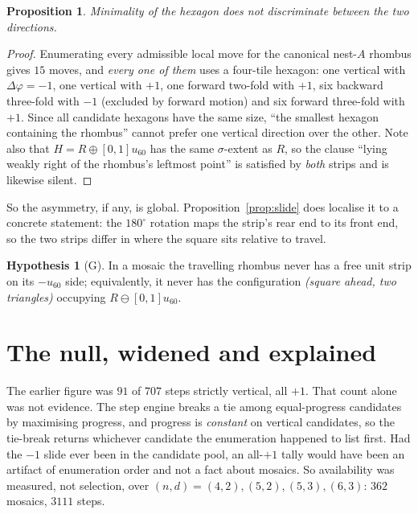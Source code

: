 \documentclass[11pt]{article}
\theoremstyle{plain}
\newtheorem{proposition}[theorem]{Proposition}
\theoremstyle{definition}
\newtheorem{hypothesis}[theorem]{Hypothesis}
\begin{document}
\begin{proposition}\label{prop:minimality}
Minimality of the hexagon does not discriminate between the two directions.
\end{proposition}

\begin{proof}
Enumerating every admissible local move for the canonical nest-$A$ rhombus gives
$15$ moves, and \emph{every one of them} uses a four-tile hexagon:
one vertical with $\Delta\varphi=-1$, one vertical with $+1$, one forward
two-fold with $+1$, six backward three-fold with $-1$ (excluded by forward
motion) and six forward three-fold with $+1$.  Since all candidate hexagons have
the same size, ``the smallest hexagon containing the rhombus'' cannot prefer one
vertical direction over the other.  Note also that $H=R\oplus[0,1]u_{60}$ has the
same $\sigma$-extent as $R$, so the clause ``lying weakly right of the rhombus's
leftmost point'' is satisfied by \emph{both} strips and is likewise silent.
\end{proof}

So the asymmetry, if any, is global.  Proposition~\ref{prop:slide} does localise
it to a concrete statement: the $180^\circ$ rotation maps the strip's rear end to
its front end, so the two strips differ in where the square sits relative to
travel.

\begin{hypothesis}[G]\label{hyp:G}
In a mosaic the travelling rhombus never has a free unit strip on its
$-u_{60}$ side; equivalently, it never has the configuration
\emph{(square ahead, two triangles)} occupying $R\ominus[0,1]u_{60}$.
\end{hypothesis}

\section{The null, widened and explained}

The earlier figure was $91$ of $707$ steps strictly vertical, all $+1$.  That
count alone was not evidence.  The step engine breaks a tie among equal-progress
candidates by maximising progress, and progress is \emph{constant} on vertical
candidates, so the tie-break returns whichever candidate the enumeration happened
to list first.  Had the $-1$ slide ever been in the candidate pool, an all-$+1$
tally would have been an artifact of enumeration order and not a fact about
mosaics.  So availability was measured, not selection, over
$(n,d)=(4,2),(5,2),(5,3),(6,3)$: $362$ mosaics, $3111$ steps.
\end{document}
